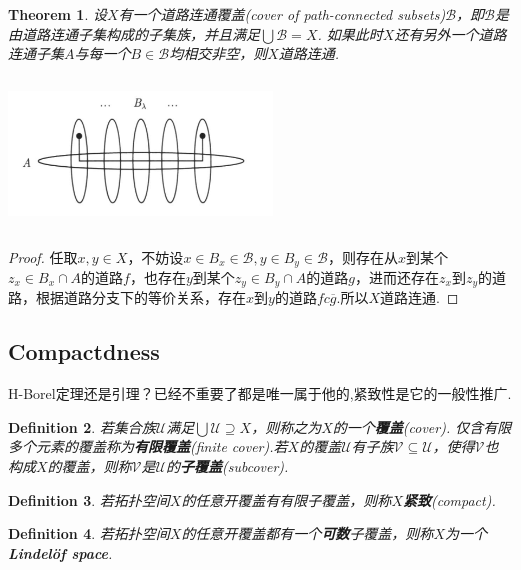 \documentclass{article}
\newtheorem{theorem}{Theorem}[section]
\newtheorem{definition}[theorem]{Definition}
\begin{document}
\begin{theorem}
设$X$有一个道路连通覆盖(cover of path-connected subsets)$\mathscr{B}$，即$\mathscr{B}$是由道路连通子集构成的子集族，并且满足$\bigcup \mathscr{B} = X$. 如果此时$X$还有另外一个道路连通子集$A$与每一个$B \in \mathscr{B}$均相交非空，则$X$道路连通.

\begin{center}
\includegraphics[width=7cm, height=4cm]{images/cover_of_path_connected_subsets.png}
\end{center}

\end{theorem}

\begin{proof}
任取$x,y \in X$，不妨设$x \in B_x \in \mathscr{B},y \in B_y \in \mathscr{B}$，则存在从$x$到某个$z_x \in B_x \cap A$的道路$f$，也存在$y$到某个$z_y \in B_y \cap A$的道路$g$，进而还存在$z_x$到$z_y$的道路，根据道路分支下的等价关系，存在$x$到$y$的道路$fc\overline{g}$.所以$X$道路连通.
\end{proof}


\newpage
\subsection{Compactdness}

\rm H-Borel定理还是引理？已经不重要了都是唯一属于他的,紧致性是它的一般性推广.

\begin{definition}
若集合族$\mathcal{U}$满足$\bigcup\mathcal{U} \supseteq X$，则称之为$X$的一个\textbf{覆盖}(\rm cover). 仅含有限多个元素的覆盖称为\textbf{有限覆盖}(finite cover).若$X$的覆盖$\mathcal{U}$有子族$\mathcal{V} \subseteq \mathcal{U}$，使得$\mathcal{V}$也构成$X$的覆盖，则称$\mathcal{V}$是$\mathcal{U}$的\textbf{子覆盖}(subcover).
\end{definition}


\begin{definition}
若拓扑空间$X$的任意开覆盖有有限子覆盖，则称$X$\textbf{紧致}(\rm compact).
\end{definition}

\begin{definition}
若拓扑空间$X$的任意开覆盖都有一个\textbf{可数}子覆盖，则称$X$为一个\rm \textbf{Lindelöf space}.
\end{definition}
\end{document}
